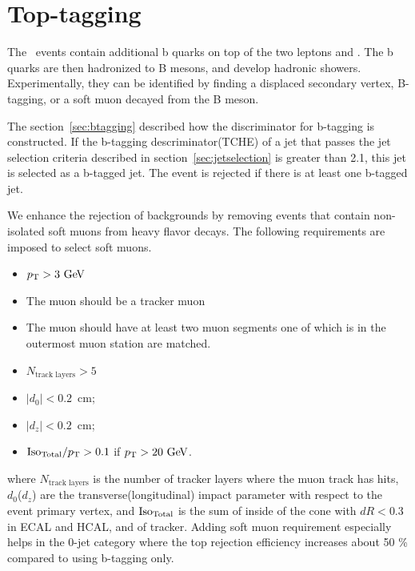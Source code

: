 \section{ Top-tagging }

The \topbkg\ events contain additional b quarks on top of 
the two leptons and \met. The b quarks are then hadronized to B mesons, 
and develop hadronic showers. Experimentally,  
they can be identified by finding a displaced secondary vertex, B-tagging,
or a soft muon decayed from the B meson. 

The section~\ref{sec:btagging} described how the discriminator for b-tagging is constructed. 
If the b-tagging descriminator(TCHE) of a jet that passes 
the jet selection criteria described in section~\ref{sec:jetselection} 
is greater than 2.1, this jet is selected as a b-tagged jet. 
The event is rejected if there is at least one b-tagged jet. 

We enhance the rejection of \topbkg{} backgrounds by removing events that contain 
non-isolated soft muons from heavy flavor decays. The following requirements are imposed to 
select soft muons. 
\begin{itemize} 
    \item $p_\mathrm{T} > 3~\mathrm{Ge\kern -0.1em V}$ 
    \item The muon should be a tracker muon
    \item The muon should have at least two muon segments one of which is 
          in the outermost muon station are matched.
    \item $N_{\textrm{track layers}}>5$ 
    \item $|d_{0}| < 0.2$~cm;
    \item $|d_{z}| <0.2$~cm;
    \item ${\rm{Iso}_{\textrm{Total}}}/{p_\mathrm{T}}>0.1$ if $p_\mathrm{T}>20~\mathrm{Ge\kern -0.1em V}$.
\end{itemize} 
where $N_{\textrm{track layers}}$ is the number of tracker layers where the muon track has hits, 
$d_{0}$($d_{z}$) are the transverse(longitudinal) impact parameter with respect to 
the event primary vertex, and $\rm{Iso}_{\textrm{Total}}$ is the sum of \Et{} inside of the cone 
with $dR < 0.3$ in ECAL and HCAL, and \pt{} of tracker. Adding soft muon requirement 
especially helps in the 0-jet category where the top rejection efficiency increases 
about 50 \% compared to using b-tagging only.


